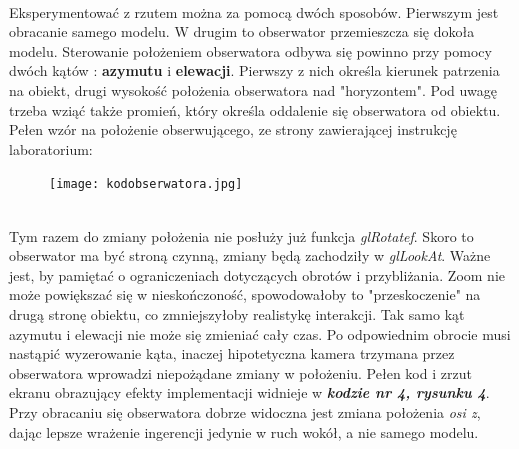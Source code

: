 \documentclass[a4paper,11pt]{article}
\begin{document}
\\\indent Eksperymentować z rzutem można za pomocą dwóch sposobów. Pierwszym jest obracanie samego modelu. W drugim to obserwator przemieszcza się dokoła modelu. Sterowanie położeniem obserwatora odbywa się powinno przy pomocy dwóch kątów : \textbf{azymutu} i \textbf{elewacji}. Pierwszy z nich określa kierunek patrzenia na obiekt, drugi wysokość położenia obserwatora nad "horyzontem". Pod uwagę trzeba wziąć także promień, który określa oddalenie się obserwatora od obiektu. Pełen wzór na położenie obserwującego, ze strony zawierającej instrukcję laboratorium:
    \begin{figure}[h!]
      \centering
      \texttt{[image: kodobserwatora.jpg]}
      \label{fig:zrzut1}
    \end{figure} 
\\\indent Tym razem do zmiany położenia nie posłuży już funkcja \textit{glRotatef}. Skoro to obserwator ma być stroną czynną, zmiany będą zachodziły w  \textit{glLookAt}. Ważne jest, by pamiętać o ograniczeniach dotyczących obrotów i przybliżania. Zoom nie może powiększać się w nieskończoność, spowodowałoby to "przeskoczenie" na drugą stronę obiektu, co zmniejszyłoby realistykę interakcji. Tak samo kąt azymutu i elewacji nie może się zmieniać cały czas. Po odpowiednim obrocie musi nastąpić wyzerowanie kąta, inaczej hipotetyczna kamera trzymana przez obserwatora wprowadzi niepożądane zmiany w położeniu. Pełen kod i zrzut ekranu obrazujący efekty implementacji widnieje w  \textit{\textbf{kodzie nr 4, rysunku 4}}. Przy obracaniu się obserwatora dobrze widoczna jest zmiana położenia \textit{osi z}, dając lepsze wrażenie ingerencji jedynie w ruch wokół, a nie samego modelu. 
\end{document}
